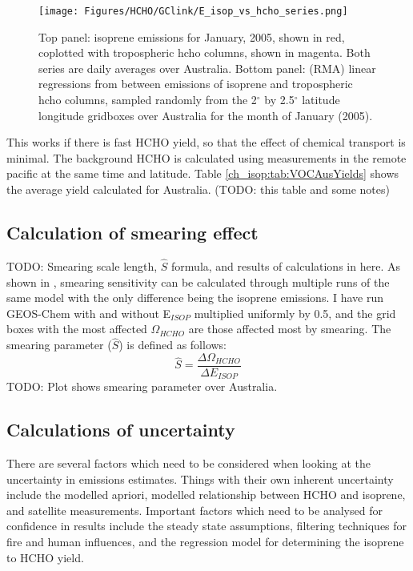     \begin{figure}[!htbp]
      \texttt{[image: Figures/HCHO/GClink/E\_isop\_vs\_hcho\_series.png]}
      \caption{%
	Top panel: isoprene emissions for January, 2005, shown in red, coplotted with tropospheric hcho columns, shown in magenta.
	Both series are daily averages over Australia.
	Bottom panel: (RMA) linear regressions from between emissions of isoprene and tropospheric hcho columns, sampled randomly from the 2$^{\circ}$ by 2.5$^{\circ}$ latitude longitude gridboxes over Australia for the month of January (2005).
      }
      \label{ch_isop:fig:E_isop_vs_hcho_model_sample}
    \end{figure}
    
    This works if there is fast HCHO yield, so that the effect of chemical transport is minimal.
    The background HCHO is calculated using measurements in the remote pacific at the same time and latitude.
    Table \ref{ch_isop:tab:VOCAusYields} shows the average yield calculated for Australia. (TODO: this table and some notes)
    
  \subsection{Calculation of smearing effect}
    TODO: Smearing scale length, $\hat{S}$ formula, and results of calculations in here.
    As shown in \cite{Palmer2003}, smearing sensitivity can be calculated through multiple runs of the same model with the only difference being the isoprene emissions.
    I have run GEOS-Chem with and without E$_{ISOP}$ multiplied uniformly by 0.5, and the grid boxes with the most affected $\Omega_{HCHO}$ are those affected most by smearing.
    The smearing parameter  ($\hat{S}$) is defined as follows:
    \begin{equation}
      \hat{S} = \frac{\Delta \Omega_{HCHO}}{\Delta E_{ISOP}}
    \end{equation}
    TODO: Plot shows smearing parameter over Australia.
  
  \subsection{Calculations of uncertainty}
    There are several factors which need to be considered when looking at the uncertainty in emissions estimates.
    Things with their own inherent uncertainty include the modelled apriori, modelled relationship between HCHO and isoprene, and satellite measurements. 
    Important factors which need to be analysed for confidence in results include the steady state assumptions, filtering techniques for fire and human influences, and the regression model for determining the isoprene to HCHO yield.

